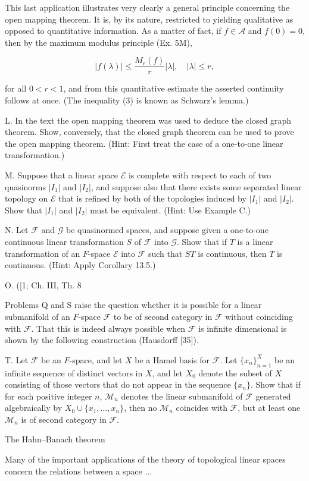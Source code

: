 This last application illustrates very clearly a general principle concerning the open mapping theorem. It is, by its nature, restricted to yielding qualitative as opposed to quantitative information. As a matter of fact, if $f \in \mathcal{A}$ and $f(0) = 0$, then by the maximum modulus principle (Ex. 5M),

$$|f(\lambda)| \leq \frac{M_r(f)}{r} |\lambda|, \quad |\lambda| \leq r,$$

for all $0 < r < 1$, and from this quantitative estimate the asserted continuity follows at once. (The inequality (3) is known as Schwarz’s lemma.)

L. In the text the open mapping theorem was used to deduce the closed graph theorem. Show, conversely, that the closed graph theorem can be used to prove the open mapping theorem. (Hint: First treat the case of a one-to-one linear transformation.)

M. Suppose that a linear space $\mathcal{E}$ is complete with respect to each of two quasinorms $|I_1|$ and $|I_2|$, and suppose also that there exists some separated linear topology on $\mathcal{E}$ that is refined by both of the topologies induced by $|I_1|$ and $|I_2|$. Show that $|I_1|$ and $|I_2|$ must be equivalent. (Hint: Use Example C.)

N. Let $\mathcal{F}$ and $\mathcal{G}$ be quasinormed spaces, and suppose given a one-to-one continuous linear transformation $S$ of $\mathcal{F}$ into $\mathcal{G}$. Show that if $T$ is a linear transformation of an $F$-space $\mathcal{E}$ into $\mathcal{F}$ such that $ST$ is continuous, then $T$ is continuous. (Hint: Apply Corollary 13.5.)

O. ([1; Ch. III, Th. 8

Problems Q and S raise the question whether it is possible for a linear submanifold of an $F$-space $\mathcal{F}$ to be of second category in $\mathcal{F}$ without coinciding with $\mathcal{F}$. That this is indeed always possible when $\mathcal{F}$ is infinite dimensional is shown by the following construction (Hausdorff [35]).

T. Let $\mathcal{F}$ be an $F$-space, and let $X$ be a Hamel basis for $\mathcal{F}$. Let $\{x_n\}_{n=1}^X$ be an infinite sequence of distinct vectors in $X$, and let $X_0$ denote the subset of $X$ consisting of those vectors that do not appear in the sequence $\{x_n\}$. Show that if for each positive integer $n$, $\mathcal{M}_n$ denotes the linear submanifold of $\mathcal{F}$ generated algebraically by $X_0 \cup \{x_1, \ldots, x_n\}$, then no $\mathcal{M}_n$ coincides with $\mathcal{F}$, but at least one $\mathcal{M}_n$ is of second category in $\mathcal{F}$.

The Hahn–Banach theorem

Many of the important applications of the theory of topological linear spaces concern the relations between a space
...

